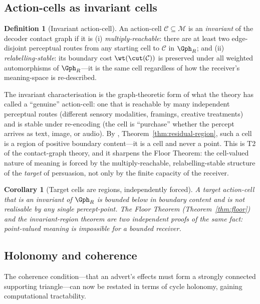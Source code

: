 \documentclass[twocolumn,11pt,a4paper]{article}
\theoremstyle{adv}
\newtheorem{corollary}[theorem]{Corollary}
\theoremstyle{definition}
\newtheorem{definition}[theorem]{Definition}
\theoremstyle{remark}
\newcommand{\Cell}{\mathcal{C}}        %
\newcommand{\Recv}{R}                  %
\newcommand{\Mean}{\mathcal{M}}        %
\begin{document}
\subsection{Action-cells as invariant cells}

\begin{definition}[Invariant action-cell]
\label{def:invariant-cell}
An action-cell $\Cell\subseteq\Mean$ is an \emph{invariant} of the decoder
contact graph if it is (i) \emph{multiply-reachable}: there are at least two
edge-disjoint perceptual routes from any starting cell to $\Cell$ in
$\Gph_\Recv$; and (ii) \emph{relabelling-stable}: its boundary cost
$\wt(\cut(\Cell))$ is preserved under all weighted automorphisms of
$\Gph_\Recv$---it is the same cell regardless of how the receiver's meaning-space
is re-described.
\end{definition}

The invariant characterisation is the graph-theoretic form of what the theory
has called a ``genuine'' action-cell: one that is reachable by many independent
perceptual routes (different sensory modalities, framings, creative treatments)
and is stable under re-encoding (the cell is ``purchase'' whether the percept
arrives as text, image, or audio). By \citet{sachikonye2025contact},
Theorem~\ref{thm:residual-region}, such a cell is a region of positive boundary
content---it is a cell and never a point. This is T2 of the contact-graph
theory, and it sharpens the Floor Theorem: the cell-valued nature of meaning is
forced by the multiply-reachable, relabelling-stable structure of the
\emph{target} of persuasion, not only by the finite capacity of the receiver.

\begin{corollary}[Target cells are regions, independently forced]
\label{cor:target-region}
A target action-cell that is an invariant of $\Gph_\Recv$ is bounded below in
boundary content and is not realisable by any single percept-point. The Floor
Theorem (Theorem~\ref{thm:floor}) and the invariant-region theorem
\citep[T2]{sachikonye2025contact} are two independent proofs of the same fact:
point-valued meaning is impossible for a bounded receiver.
\end{corollary}

\subsection{Holonomy and coherence}

The coherence condition---that an advert's effects must form a strongly connected
supporting triangle---can now be restated in terms of cycle holonomy, gaining
computational tractability.
\end{document}
